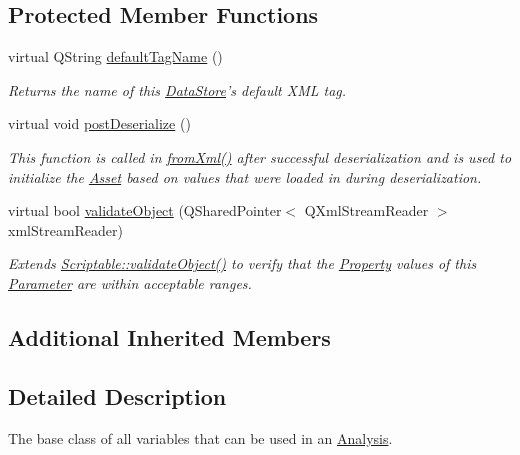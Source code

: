 \subsection*{Protected Member Functions}
\begin{DoxyCompactItemize}
\item 
virtual Q\-String \hyperlink{class_picto_1_1_analysis_variable_a58f1137dd98931e5bb5124f3f2ce7b08}{default\-Tag\-Name} ()
\begin{DoxyCompactList}\small\item\em Returns the name of this \hyperlink{class_picto_1_1_data_store}{Data\-Store}'s default X\-M\-L tag. \end{DoxyCompactList}\item 
virtual void \hyperlink{class_picto_1_1_analysis_variable_a1c211501a9805870703207eb9b305bc1}{post\-Deserialize} ()
\begin{DoxyCompactList}\small\item\em This function is called in \hyperlink{class_picto_1_1_asset_a8bed4da09ecb1c07ce0dab313a9aba67}{from\-Xml()} after successful deserialization and is used to initialize the \hyperlink{class_picto_1_1_asset}{Asset} based on values that were loaded in during deserialization. \end{DoxyCompactList}\item 
virtual bool \hyperlink{class_picto_1_1_analysis_variable_a4279b4c9eca4a7ef60de8e4db91dc6f3}{validate\-Object} (Q\-Shared\-Pointer$<$ Q\-Xml\-Stream\-Reader $>$ xml\-Stream\-Reader)
\begin{DoxyCompactList}\small\item\em Extends \hyperlink{class_picto_1_1_scriptable_ab6e2944c43a3b5d418bf7b251594386d}{Scriptable\-::validate\-Object()} to verify that the \hyperlink{class_picto_1_1_property}{Property} values of this \hyperlink{class_picto_1_1_parameter}{Parameter} are within acceptable ranges. \end{DoxyCompactList}\end{DoxyCompactItemize}
\subsection*{Additional Inherited Members}


\subsection{Detailed Description}
The base class of all variables that can be used in an \hyperlink{class_picto_1_1_analysis}{Analysis}. 

